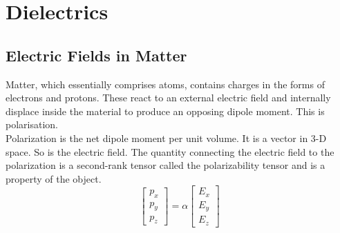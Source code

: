 \section{Dielectrics}
\subsection{Electric Fields in Matter}
Matter, which essentially comprises atoms, contains charges in the forms of electrons and protons. These react to an external electric field and internally displace inside the material to produce an opposing dipole moment. This is polarisation. \\
Polarization is the net dipole moment per unit volume. It is a vector in 3-D space. So is the electric field. The quantity connecting the electric field to the polarization is a second-rank tensor called the polarizability tensor and is a property of the object.
\begin{equation}
	\begin{bmatrix}
		p_x\\
		p_y\\
		p_z 
	\end{bmatrix}
	= \alpha
	\begin{bmatrix}
		E_x\\
		E_y\\
		E_z
	\end{bmatrix}
\end{equation}
